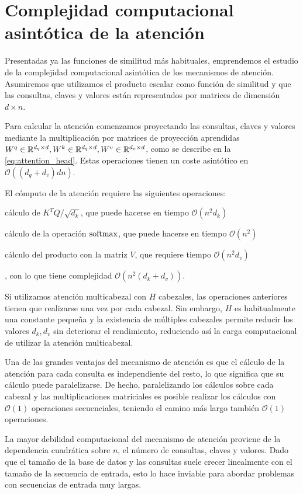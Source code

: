 \section{Complejidad computacional asintótica de la atención}
Presentadas ya las funciones de similitud más habituales, emprendemos el estudio de la complejidad computacional asintótica de los mecanismos de atención. Asumiremos que utilizamos el producto escalar como función de similitud y que las consultas, claves y valores están representados por matrices de dimensión \( d \times n \).

Para calcular la atención comenzamos proyectando las consultas, claves y valores mediante la multiplicación por matrices de proyección aprendidas \( W^q \in \mathbb{R}^{d_q \times d}, W^k \in \mathbb{R}^{d_q \times d}, W^v \in \mathbb{R}^{d_v \times d}\), como se describe en la \cref{eq:attention_head}. Estas operaciones tienen un coste asintótico en \( \mathcal{O}((d_q + d_v)dn) \).

El cómputo de la atención requiere las siguientes operaciones: \begin{enumerate*}[label=(\roman*)]
    \item cálculo de \( K^T Q / \sqrt{d_k} \), que puede hacerse en tiempo \( \mathcal{O}(n^2 d_k) \)
    \item cálculo de la operación \( \operatorname{softmax} \), que puede hacerse en tiempo \( \mathcal{O}(n^2) \)
    \item cálculo del producto con la matriz \( V \), que requiere tiempo \( \mathcal{O}(n^2 d_v) \)
\end{enumerate*}, con lo que tiene complejidad \( \mathcal{O}(n^2 (d_k + d_v)) \).

Si utilizamos atención multicabezal con \( H \) cabezales, las operaciones anteriores tienen que realizarse una vez por cada cabezal. Sin embargo, \( H \) es habitualmente una constante pequeña \cite{voita2019analyzing} y la existencia de múltiples cabezales permite reducir los valores \( d_k, d_v \) sin deteriorar el rendimiento, reduciendo así la carga computacional de utilizar la atención multicabezal.

Una de las grandes ventajas del mecanismo de atención es que el cálculo de la atención para cada consulta es independiente del resto, lo que significa que su cálculo puede paralelizarse. De hecho, paralelizando los cálculos sobre cada cabezal y las multiplicaciones matriciales es posible realizar los cálculos con \( \mathcal{O}(1) \) operaciones secuenciales, teniendo el camino más largo también  \( \mathcal{O}(1) \) operaciones. 

La mayor debilidad computacional del mecanismo de atención proviene de la dependencia cuadrática sobre \( n \), el número de consultas, claves y valores. Dado que el tamaño de la base de datos y las consultas suele crecer linealmente con el tamaño de la secuencia de entrada, esto lo hace inviable para abordar problemas con secuencias de entrada muy largas.